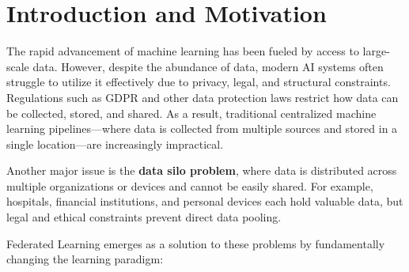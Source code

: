 

\chapter{Introduction and Motivation} %
\label{ch:chapter1}

The rapid advancement of machine learning has been fueled by access to large-scale data. However, despite the abundance of data, modern AI systems often struggle to utilize it effectively due to privacy, legal, and structural constraints. Regulations such as GDPR and other data protection laws restrict how data can be collected, stored, and shared. As a result, traditional centralized machine learning pipelines---where data is collected from multiple sources and stored in a single location---are increasingly impractical.

Another major issue is the \textbf{data silo problem}, where data is distributed across multiple organizations or devices and cannot be easily shared. For example, hospitals, financial institutions, and personal devices each hold valuable data, but legal and ethical constraints prevent direct data pooling.

Federated Learning emerges as a solution to these problems by fundamentally changing the learning paradigm:

